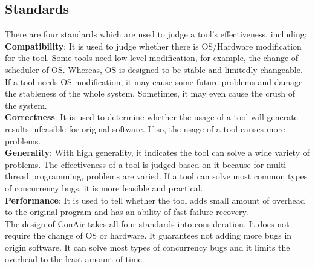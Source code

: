 \subsection{Standards} There are four standards which are used to judge a tool's
effectiveness, including:\\
\indent\textbf{Compatibility}: It is used to judge
whether there is OS/Hardware modification for the tool. Some tools need low
level modification, for example, the change of scheduler of OS. Whereas, OS is
designed to be stable and limitedly changeable. If a tool needs OS modification,
it may cause some future problems and damage the stableness of the whole system.
Sometimes, it may even cause the crush of the system.\\
\indent\textbf{Correctness}: It is used to determine whether the usage of a tool
will generate results infeasible for original software. If so, the usage of a
tool causes more problems.\\
\indent\textbf{Generality}: With high generality,
it indicates the tool can solve a wide variety of problems. The effectiveness of
a tool is judged based on it because for multi-thread programming, problems are
varied. If a tool can solve most common types of concurrency bugs, it is more
feasible and practical.\\
\indent\textbf{Performance}: It is used to tell
whether the tool adds small amount of overhead to the original program and has
an ability of fast failure recovery. \\ The design of ConAir takes all four
standards into consideration. It does not require the change of OS or hardware.
It guarantees not adding more bugs in origin software. It can solve most types
of concurrency bugs and it limits the overhead to the least amount of time.
